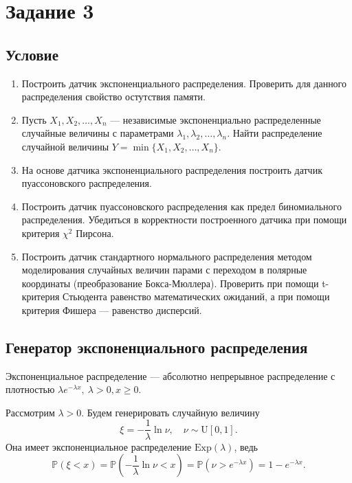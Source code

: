 \documentclass[11pt]{report}
\begin{document}
\section{Задание 3}

\subsection{Условие}

\begin{enumerate}
\item Построить датчик экспоненциального распределения. Проверить для данного
распределения свойство остутствия памяти.

\item Пусть $X_1,X_2,\dots,X_n$ --- независимые экспоненциально распределенные случайные величины с параметрами
$\lambda_1,\lambda_2,\dots,\lambda_n$. Найти распределение случайной величины $Y=\min\{X_1,X_2,\dots,X_n\}$.

\item На основе датчика экспоненциального распределения построить датчик пуассоновского распределения.

\item Построить датчик пуассоновского распределения как предел биномиального распределения. Убедиться в корректности
построенного датчика при помощи критерия $\chi^2$ Пирсона.

\item Построить датчик стандартного нормального распределения методом моделирования случайных величин парами с переходом в полярные координаты 
(преобразование Бокса-Мюллера). Проверить при помощи t-критерия Стьюдента равенство математических ожиданий, а при помощи критерия Фишера — равенство дисперсий.
\end{enumerate}

\subsection{Генератор экспоненциального распределения}

\begin{definition}
Экспоненциальное распределение --- абсолютно непрерывное распределение с плотностью $\lambda e^{-\lambda x},~\lambda>0,x\geqslant 0$.
\end{definition}

Рассмотрим $\lambda > 0$. Будем генерировать случайную величину
$$
\xi = -\frac{1}{\lambda}\ln\nu,\quad \nu\sim\mathrm{U}[0,1].
$$
Она имеет экспоненциальное распределение $\mathrm{Exp}(\lambda)$, ведь
$$
\mathbb{P}(\xi < x) = \mathbb{P}(-\frac{1}{\lambda}\ln\nu < x) = \mathbb{P}(\nu > e^{-\lambda x}) = 1 - e^{-\lambda x}.
$$
\end{document}
